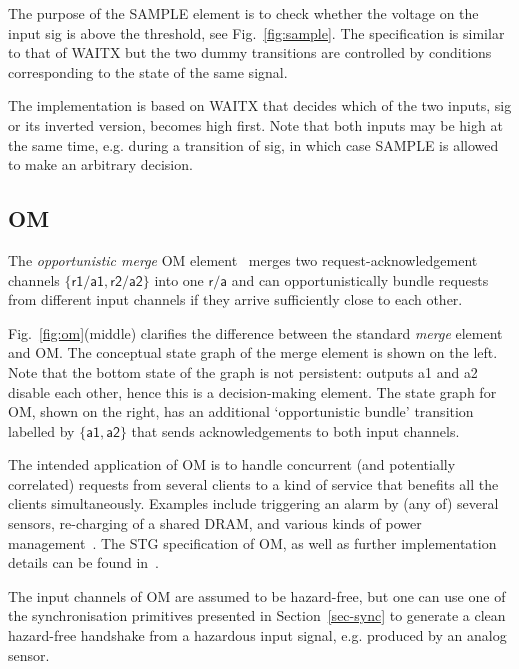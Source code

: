 \documentclass[conference]{IEEEtran}
\begin{document}
The purpose of the \textsf{SAMPLE} element is to check whether the voltage on the input
\textsf{sig} is above the threshold, see Fig.~\ref{fig:sample}. The specification is similar
to that of \textsf{WAITX} but the two dummy transitions are controlled by conditions
corresponding to the state of the same signal.

The implementation is based on \textsf{WAITX} that decides which of the two inputs,
\textsf{sig} or its inverted version, becomes high first. Note that both inputs may be
high at the same time, e.g. during a transition of \textsf{sig}, in which case
\textsf{SAMPLE} is allowed to make an arbitrary decision.

\subsection*{\textsf{OM}}

The \emph{opportunistic merge} \textsf{OM} element~\cite{2015_mokhov_om} merges two
request-acknowledgement channels $\{\textsf{r1}/\textsf{a1}, \textsf{r2}/\textsf{a2}\}$
into one $\textsf{r}/\textsf{a}$ and can opportunistically bundle requests from different
input channels if they arrive sufficiently close to each other.

Fig.~\ref{fig:om}(middle) clarifies the difference between the standard \emph{merge}
element~\cite{1999_greenstreet_merge} and \textsf{OM}. The conceptual state graph of
the merge element is shown on the left. Note that the bottom state of the graph is not
persistent: outputs \textsf{a1} and \textsf{a2} disable each other, hence this is a
decision-making element. The state graph for \textsf{OM}, shown on the right, has an additional
`opportunistic bundle' transition labelled by $\{\textsf{a1},\textsf{a2}\}$ that sends
acknowledgements to both input channels.

The intended application of \textsf{OM} is to handle concurrent (and potentially correlated) requests
from several clients to a kind of service that benefits all the clients simultaneously. Examples
include triggering an alarm by (any of) several sensors, re-charging of a shared DRAM, and
various kinds of power management~\cite{2017_sokolov_a4a}. The STG specification of
\textsf{OM}, as well as further implementation details can be found in~\cite{2015_mokhov_om}.

The input channels of \textsf{OM} are assumed to be hazard-free, but one can use one of the
synchronisation primitives presented in Section~\ref{sec-sync} to generate a clean hazard-free
handshake from a hazardous input signal, e.g. produced by an analog sensor.
\end{document}
